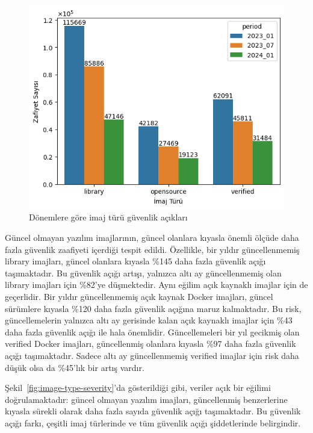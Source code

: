 \begin{figure}
    \centering
    \includegraphics[width=1\linewidth]{images/s2/image-type-by-periods.png}
    \caption{Dönemlere göre imaj türü güvenlik açıkları}\label{fig:image-type-by-periods}
\end{figure}

Güncel olmayan yazılım imajlarının, güncel olanlara kıyasla önemli ölçüde daha fazla güvenlik zaafiyeti içerdiği tespit edildi. Özellikle, bir yıldır güncellenmemiş library imajları, güncel olanlara kıyasla \%145 daha fazla güvenlik açığı taşımaktadır. Bu güvenlik açığı artışı, yalnızca altı ay güncellenmemiş olan library imajları için \%82'ye düşmektedir. Aynı eğilim açık kaynaklı imajlar için de geçerlidir. Bir yıldır güncellenmemiş açık kaynak Docker imajları, güncel sürümlere kıyasla \%120 daha fazla güvenlik açığına maruz kalmaktadır. Bu risk, güncellemelerin yalnızca altı ay gerisinde kalan açık kaynaklı imajlar için \%43 daha fazla güvenlik açığı ile hala önemlidir. Güncellemeleri bir yıl gecikmiş olan verified Docker imajları, güncellenmiş olanlara kıyasla \%97 daha fazla güvenlik açığı taşımaktadır. Sadece altı ay güncellenmemiş verified imajlar için risk daha düşük olsa da \%45'lık bir artış vardır.

Şekil~\ref{fig:image-type-severity}'da gösterildiği gibi, veriler açık bir eğilimi doğrulamaktadır: güncel olmayan yazılım imajları, güncellenmiş benzerlerine kıyasla sürekli olarak daha fazla sayıda güvenlik açığı taşımaktadır. Bu güvenlik açığı farkı, çeşitli imaj türlerinde ve tüm güvenlik açığı şiddetlerinde belirgindir.

